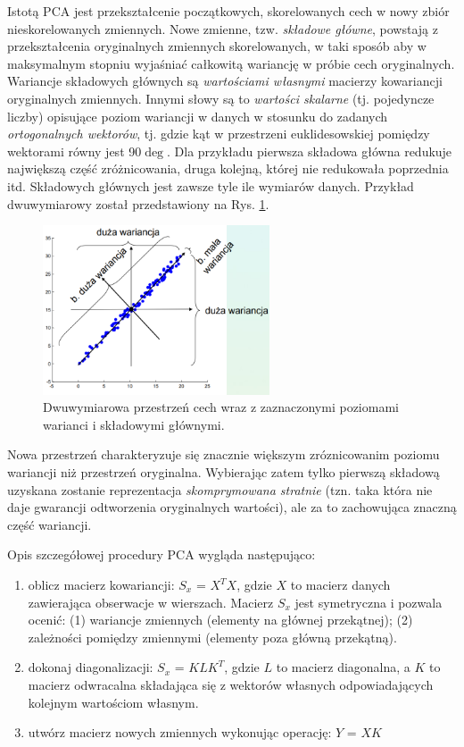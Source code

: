 Istotą PCA jest przekształcenie początkowych, skorelowanych cech w nowy zbiór nieskorelowanych zmiennych. Nowe zmienne, tzw. \textit{składowe główne}, powstają z przekształcenia oryginalnych zmiennych skorelowanych, w taki sposób aby w maksymalnym stopniu wyjaśniać całkowitą wariancję w próbie cech oryginalnych. Wariancje składowych głównych są \textit{wartościami własnymi} macierzy kowariancji oryginalnych zmiennych. Innymi słowy są to \textit{wartości skalarne} (tj. pojedyncze liczby) opisujące poziom wariancji w danych w stosunku do zadanych \textit{ortogonalnych wektorów}, tj. gdzie kąt w przestrzeni euklidesowskiej pomiędzy wektorami równy jest 90$\deg$. Dla przykładu pierwsza składowa główna redukuje największą część zróżnicowania, druga kolejną, której nie redukowała poprzednia itd. Składowych głównych jest zawsze tyle ile wymiarów danych. Przykład dwuwymiarowy został przedstawiony na Rys. \ref{PCA-2dim}.
\begin{figure}[h!]
	\centering
	\includegraphics[width=0.6\textwidth]{figures/PCA.png}
	\caption{Dwuwymiarowa przestrzeń cech wraz z zaznaczonymi poziomami warianci i składowymi głównymi.}
	\label{PCA-2dim}
\end{figure}
Nowa przestrzeń charakteryzuje się znacznie większym zróznicowanim poziomu wariancji niż przestrzeń oryginalna. Wybierając zatem tylko pierwszą składową uzyskana zostanie reprezentacja \textit{skomprymowana stratnie} (tzn. taka która nie daje gwarancji odtworzenia oryginalnych wartości), ale za to zachowująca znaczną część wariancji.

Opis szczegółowej procedury PCA wygląda następująco:
\begin{enumerate}
\item oblicz macierz kowariancji: $S_x$ = $X^{T}X$, gdzie $X$ to macierz danych zawierająca obserwacje w wierszach. Macierz $S_x$ jest symetryczna i pozwala ocenić: (1) wariancje zmiennych (elementy na głównej przekątnej); (2) zależności pomiędzy zmiennymi (elementy poza główną przekątną). 
\item dokonaj diagonalizacji: $S_x$ = $KLK^T$, gdzie $L$ to macierz diagonalna, a $K$ to macierz odwracalna składająca się z wektorów własnych odpowiadających kolejnym wartościom własnym.
\item utwórz macierz nowych zmiennych wykonując operację: $Y$ = $XK$
\end{enumerate}

